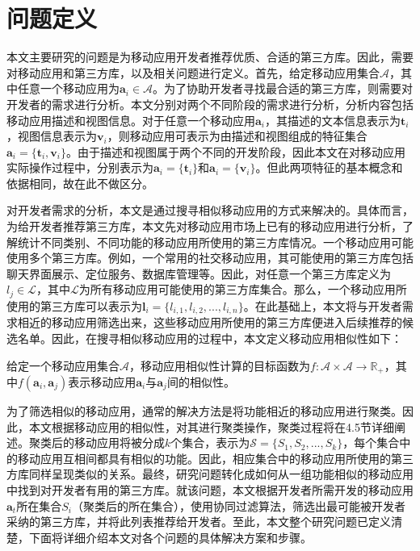 \section{问题定义}
本文主要研究的问题是为移动应用开发者推荐优质、合适的第三方库。因此，需要对移动应用和第三方库，以及相关问题进行定义。首先，给定移动应用集合$\mathcal{A}$，其中任意一个移动应用为$\mathbf{a}_i \in \mathcal{A}$。为了协助开发者寻找最合适的第三方库，则需要对开发者的需求进行分析。本文分别对两个不同阶段的需求进行分析，分析内容包括移动应用描述和视图信息。对于任意一个移动应用$\mathbf{a}_i$，其描述的文本信息表示为$\mathbf{t}_i$，视图信息表示为$\mathbf{v}_i$，则移动应用可表示为由描述和视图组成的特征集合$\mathbf{a}_i = \{\mathbf{t}_i, \mathbf{v}_i\}$。由于描述和视图属于两个不同的开发阶段，因此本文在对移动应用实际操作过程中，分别表示为$\mathbf{a}_i = \{\mathbf{t}_i\}$和$\mathbf{a}_i = \{\mathbf{v}_i\}$。但此两项特征的基本概念和依据相同，故在此不做区分。

对开发者需求的分析，本文是通过搜寻相似移动应用的方式来解决的。具体而言，为给开发者推荐第三方库，本文先对移动应用市场上已有的移动应用进行分析，了解统计不同类别、不同功能的移动应用所使用的第三方库情况。一个移动应用可能使用多个第三方库。例如，一个常用的社交移动应用，其可能使用的第三方库包括聊天界面展示、定位服务、数据库管理等。因此，对任意一个第三方库定义为$l_j \in \mathcal{L}$，其中$\mathcal{L}$为所有移动应用可能使用的第三方库集合。那么，一个移动应用所使用的第三方库可以表示为$\mathbf{l}_i = \{l_{i,1}, l_{i,2}, ..., l_{i,n}\}$。在此基础上，本文将与开发者需求相近的移动应用筛选出来，这些移动应用所使用的第三方库便进入后续推荐的候选名单。因此，在搜寻相似移动应用的过程中，本文定义移动应用相似性如下：
\begin{definition}[移动应用相似性]
给定一个移动应用集合$\mathcal{A}$，移动应用相似性计算的目标函数为$f:\mathcal{A} \times \mathcal{A} \rightarrow \mathbb{R_+}$，其中$f(\mathbf{a}_i, \mathbf{a}_j)$表示移动应用$\mathbf{a}_i$与$\mathbf{a}_j$间的相似性。
\end{definition}

为了筛选相似的移动应用，通常的解决方法是将功能相近的移动应用进行聚类。因此，本文根据移动应用的相似性，对其进行聚类操作，聚类过程将在4.5节详细阐述。聚类后的移动应用将被分成$k$个集合，表示为$\mathcal{S} = \{S_1, S_2, ..., S_k\}$，每个集合中的移动应用互相间都具有相似的功能。因此，相应集合中的移动应用所使用的第三方库同样呈现类似的关系。最终，研究问题转化成如何从一组功能相似的移动应用中找到对开发者有用的第三方库。就该问题，本文根据开发者所需开发的移动应用$\mathbf{a}_t$所在集合$S_i$（聚类后的所在集合），使用协同过滤算法，筛选出最可能被开发者采纳的第三方库，并将此列表推荐给开发者。至此，本文整个研究问题已定义清楚，下面将详细介绍本文对各个问题的具体解决方案和步骤。



